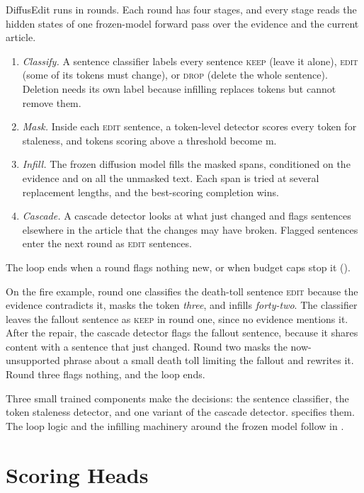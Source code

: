\documentclass[]{paper}
\newcommand{\mask}{\ensuremath{\mathrm{m}}}
\newcommand{\keep}{\textsc{keep}}
\newcommand{\edit}{\textsc{edit}}
\newcommand{\drop}{\textsc{drop}}
\begin{document}
DiffusEdit runs in rounds. Each round has four stages, and every stage reads the hidden states of one frozen-model forward pass over the evidence and the current article.

\begin{enumerate}
\item \emph{Classify.} A sentence classifier labels every sentence \keep{} (leave it alone), \edit{} (some of its tokens must change), or \drop{} (delete the whole sentence). Deletion needs its own label because infilling replaces tokens but cannot remove them.
\item \emph{Mask.} Inside each \edit{} sentence, a token-level detector scores every token for staleness, and tokens scoring above a threshold become \mask{}.
\item \emph{Infill.} The frozen diffusion model fills the masked spans, conditioned on the evidence and on all the unmasked text. Each span is tried at several replacement lengths, and the best-scoring completion wins.
\item \emph{Cascade.} A cascade detector looks at what just changed and flags sentences elsewhere in the article that the changes may have broken. Flagged sentences enter the next round as \edit{} sentences.
\end{enumerate}

The loop ends when a round flags nothing new, or when budget caps stop it ().

On the fire example, round one classifies the death-toll sentence \edit{} because the evidence contradicts it, masks the token \emph{three}, and infills \emph{forty-two}. The classifier leaves the fallout sentence as \keep{} in round one, since no evidence mentions it. After the repair, the cascade detector flags the fallout sentence, because it shares content with a sentence that just changed. Round two masks the now-unsupported phrase about a small death toll limiting the fallout and rewrites it. Round three flags nothing, and the loop ends.

Three small trained components make the decisions: the sentence classifier, the token staleness detector, and one variant of the cascade detector.  specifies them. The loop logic and the infilling machinery around the frozen model follow in .

\section{Scoring Heads}
\label{sec:heads}
\end{document}
